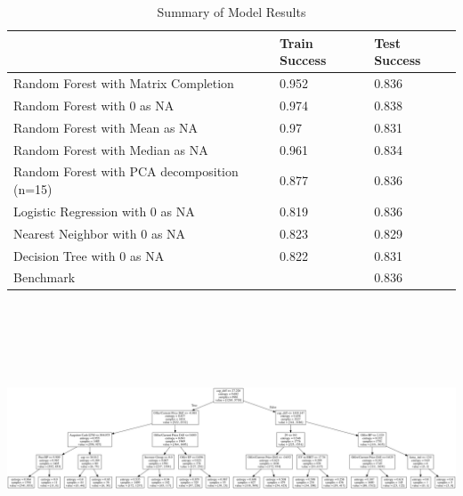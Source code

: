 \documentclass[12pt]{article}
\begin{document}
\begin{table}[h]
\caption{Summary of Model Results}
\label{my-label}
\begin{tabular}{lll}
\hline
                                            & Train Success & Test Success \\ \hline
Random Forest with Matrix Completion        & 0.952         & 0.836        \\ \hline
Random Forest with 0 as NA                  & 0.974         & 0.838        \\ \hline
Random Forest with Mean as NA               & 0.97          & 0.831        \\ \hline
Random Forest with Median as NA             & 0.961         & 0.834        \\ \hline
Random Forest with PCA decomposition (n=15) & 0.877         & 0.836        \\ \hline
Logistic Regression with 0 as NA            & 0.819         & 0.836        \\ \hline
Nearest Neighbor with 0 as NA               & 0.823         & 0.829        \\ \hline
Decision Tree with 0 as NA                  & 0.822         & 0.831        \\ \hline
Benchmark                                   &               & 0.836       
\end{tabular}
\end{table}

\begin{center}
\includegraphics[width=20cm, height=8cm, angle=90]{tree.png} 

\end{center}
\end{document}
